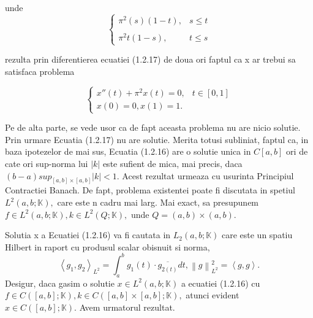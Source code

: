 \documentclass[a4paper,12pt,oneside]{report}
\begin{document}
	unde
	\begin{displaymath}
		\left\{\begin{matrix}
		\pi ^{2} \left ( s \right )\left ( 1-t \right ) , & s\leq t\\ 
		& \\ \pi ^{2}t\left ( 1-s \right ),  & t\leq s
		\end{matrix}\right.
	\end{displaymath}
					
	rezulta prin diferentierea ecuatiei  (1.2.17) de doua ori faptul ca x ar trebui sa satisfaca problema 
					
	\begin{displaymath}
		\left\{\begin{matrix}
		{x}'' \left ( t \right ) + \pi ^{2}x\left ( t \right )  = 0, & t \in \left [ 0,1 \right ] \\ 
		x\left ( 0 \right )  =  0, x \left ( 1 \right ) = 1.& 
		\end{matrix}\right.
	\end{displaymath}
					
	Pe de alta parte, se vede usor ca de fapt aceasta problema nu are nicio solutie. Prin urmare Ecuatia (1.2.17) nu are solutie. Merita totusi subliniat, faptul ca, in baza ipotezelor de mai sus, Ecuatia (1.2.16) are o solutie unica in \(C\left [ a,b \right ]\) ori de cate ori sup-norma lui \(\left | k \right |\) este sufient de mica, mai precis, daca \(\left ( b-a \right )sup_{\left [ a,b \right ]\times \left [ a,b \right ]}\left | k \right | < 1.\) Acest rezultat urmeaza cu usurinta Principiul Contractiei Banach. De fapt, problema existentei poate fi discutata in spetiul \(L^{2} \left ( a,b ;\mathbb{K} \right ),\) care este n cadru mai larg. Mai exact, sa presupunem \(f\in L^{2}\left ( a,b;\mathbb{K} \right ), k\in L^{2}\left ( Q; \mathbb{K} \right ),\) unde \(Q = \left ( a,b \right )\times \left ( a,b \right ).\) 
					
	Solutia x a Ecuatiei (1.2.16) va fi cautata in \(L_{2}\left ( a,b;\mathbb{K} \right )\) care este un spatiu Hilbert in raport cu produsul scalar obisnuit si norma, 
	\begin{displaymath}
		\left \langle g_{1}, g_{2} \right \rangle_{L^{2}} = \int_{a}^{b}g_{1}\left ( t \right ) \cdot \overline{{g_{2\left ( t \right )}}}dt, \left \| g \right \|_{L^{2}}^{2} = \left \langle g,g \right \rangle.
	\end{displaymath}
	Desigur, daca gasim o solutie \(x\in L^{2}\left ( a,b;\mathbb{K} \right )\) a ecuatiei (1.2.16) cu \(f\in C\left ( \left [ a,b \right ];\mathbb{K} \right ), k\in C\left ( \left [ a,b \right ]\times \left [ a,b \right ];\mathbb{K} \right ),\) atunci evident \(x\in C\left ( \left [ a,b \right ];\mathbb{K} \right ).\) Avem urmatorul rezultat. 
					
\end{document}
